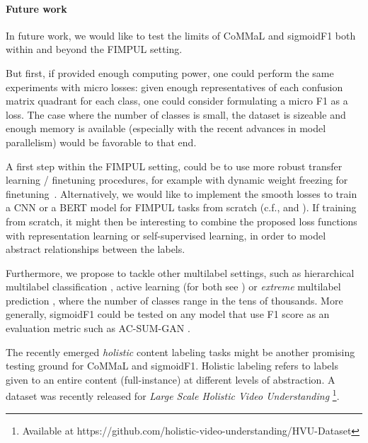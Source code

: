



\paragraph{Future work}
In future work, we would like to test the limits of CoMMaL and sigmoidF1 both within and beyond the FIMPUL setting.

But first, if provided enough computing power, one could perform the same experiments with micro losses: given enough representatives of each confusion matrix quadrant for each class, one could consider formulating a micro F1 as a loss. The case where the number of classes is small, the dataset is sizeable and enough memory is available (especially with the recent advances in model parallelism) would be favorable to that end.


A first step within the FIMPUL setting, could be to use more robust transfer learning / finetuning procedures, for example with dynamic weight freezing for finetuning~\cite{ULMFit}. Alternatively, we would like to implement the smooth losses to train a CNN or a BERT model for FIMPUL tasks from scratch (c.f., \cite{tencent} and \cite{focalLoss}). If training from scratch, it might then be interesting to combine the proposed loss functions with representation learning \cite{unsupervisedImage,highResRepresentation} or self-supervised learning, in order to model abstract relationships between the labels.

Furthermore, we propose to tackle other multilabel settings, such as hierarchical multilabel classification \cite{HARAM},  active learning (for both see \cite{activeLearningMultiLabel}) or \emph{extreme} multilabel prediction \cite{extremeMultilabelText, extremeSIGIR}, where the number of classes range in the tens of thousands. More generally, sigmoidF1 could be tested on any model that use F1 score as an evaluation metric such as AC-SUM-GAN \cite{AC-SUM-GAN}.

The recently emerged \textit{holistic} content labeling tasks might be another promising testing ground for CoMMaL and sigmoidF1. Holistic labeling refers to labels given to an entire content (full-instance) at different levels of abstraction. A dataset was recently released for \emph{Large Scale Holistic Video Understanding} \cite{holisticVideoData}\footnote{Available at https://github.com/holistic-video-understanding/HVU-Dataset}.

